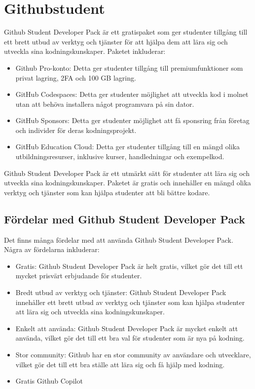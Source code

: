 \hypertarget{githubstudent}{%
\section{Githubstudent}\label{githubstudent}}

Github Student Developer Pack är ett gratispaket som ger studenter
tillgång till ett brett utbud av verktyg och tjänster för att hjälpa dem
att lära sig och utveckla sina kodningskunskaper. Paketet inkluderar:

\begin{itemize}
\tightlist
\item
  Github Pro-konto: Detta ger studenter tillgång till premiumfunktioner
  som privat lagring, 2FA och 100 GB lagring.
\item
  GitHub Codespaces: Detta ger studenter möjlighet att utveckla kod i
  molnet utan att behöva installera något programvara på sin dator.
\item
  GitHub Sponsors: Detta ger studenter möjlighet att få sponsring från
  företag och individer för deras kodningsprojekt.
\item
  GitHub Education Cloud: Detta ger studenter tillgång till en mängd
  olika utbildningsresurser, inklusive kurser, handledningar och
  exempelkod.
\end{itemize}

Github Student Developer Pack är ett utmärkt sätt för studenter att lära
sig och utveckla sina kodningskunskaper. Paketet är gratis och
innehåller en mängd olika verktyg och tjänster som kan hjälpa studenter
att bli bättre kodare.

\hypertarget{fuxf6rdelar-med-github-student-developer-pack}{%
\subsection{Fördelar med Github Student Developer
Pack}\label{fuxf6rdelar-med-github-student-developer-pack}}

Det finns många fördelar med att använda Github Student Developer Pack.
Några av fördelarna inkluderar:

\begin{itemize}
\tightlist
\item
  Gratis: Github Student Developer Pack är helt gratis, vilket gör det
  till ett mycket prisvärt erbjudande för studenter.
\item
  Bredt utbud av verktyg och tjänster: Github Student Developer Pack
  innehåller ett brett utbud av verktyg och tjänster som kan hjälpa
  studenter att lära sig och utveckla sina kodningskunskaper.
\item
  Enkelt att använda: Github Student Developer Pack är mycket enkelt att
  använda, vilket gör det till ett bra val för studenter som är nya på
  kodning.
\item
  Stor community: Github har en stor community av användare och
  utvecklare, vilket gör det till ett bra ställe att lära sig och få
  hjälp med kodning.
\item
  Gratis Github Copilot
\end{itemize}

